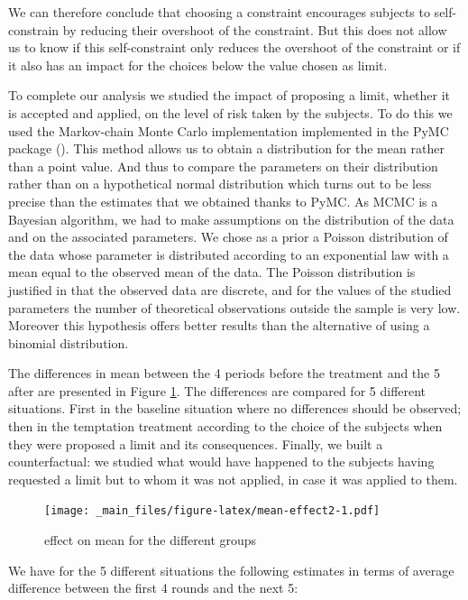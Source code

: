 \documentclass[
]{book}
\begin{document}
We can therefore conclude that choosing a constraint encourages subjects to
self-constrain by reducing their overshoot of the constraint.
But this does not allow us to know if this self-constraint only reduces the
overshoot of the constraint or if it also has an impact for the choices below
the value chosen as limit.

To complete our analysis we studied the impact of proposing a limit, whether it
is accepted and applied, on the level of risk taken by the subjects.
To do this we used the Markov-chain Monte Carlo implementation implemented in
the PyMC package (\citet{salvatier2016probabilistic}).
This method allows us to obtain a distribution for the mean rather than a point
value.
And thus to compare the parameters on their distribution rather than on a
hypothetical normal distribution which turns out to be less precise than the
estimates that we obtained thanks to PyMC.
As MCMC is a Bayesian algorithm, we had to make assumptions on the distribution
of the data and on the associated parameters.
We chose as a prior a Poisson distribution of the data whose parameter is
distributed according to an exponential law with a mean equal to the observed
mean of the data.
The Poisson distribution is justified in that the observed data are discrete,
and for the values of the studied parameters the number of theoretical
observations outside the sample is very low.
Moreover this hypothesis offers better results than the alternative of using a
binomial distribution.

The differences in mean between the 4 periods before the treatment and the 5
after are presented in Figure \ref{fig:mean-effect2}.
The differences are compared for 5 different situations.
First in the baseline situation where no differences should be observed;\\
then in the temptation treatment according to the choice of the subjects when
they were proposed a limit and its consequences.
Finally, we built a counterfactual: we studied what would have happened to the
subjects having requested a limit but to whom it was not applied, in case it was
applied to them.

\begin{figure}
\centering
\texttt{[image: \_main\_files/figure-latex/mean-effect2-1.pdf]}
\caption{\label{fig:mean-effect2}effect on mean for the different groups}
\end{figure}

We have for the 5 different situations the following estimates in terms of
average difference between the first 4 rounds and the next 5:
\end{document}
